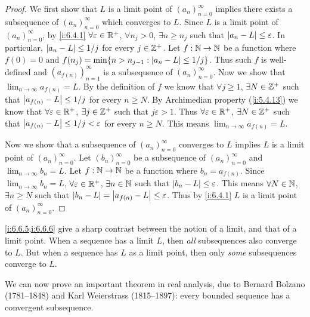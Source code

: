 \begin{proof}
  We first show that \(L\) is a limit point of \((a_n)_{n = 0}^\infty\) implies there exists a subsequence of \((a_n)_{n = 0}^\infty\) which converges to \(L\).
  Since \(L\) is a limit point of \((a_n)_{n = 0}^\infty\), by \cref{i:6.4.1} \(\forall \varepsilon \in \mathbb{R}^+\), \(\forall n_j > 0\), \(\exists n \geq n_j\) such that \(\left\lvert a_n - L\right\rvert \leq \varepsilon\).
  In particular, \(\left\lvert a_n - L\right\rvert \leq 1 / j\) for every \(j \in \mathbb{Z}^+\).
  Let \(f : \mathbb{N} \to \mathbb{N}\) be a function where \(f(0) = 0\) and \(f(n_j) = \min\set{n > n_{j - 1} : \abs{a_n - L} \leq 1 / j}\).
  Thus such \(f\) is well-defined and \((a_{f(n)})_{n = 1}^\infty\) is a subsequence of \((a_n)_{n = 0}^\infty\).
  Now we show that \(\lim_{n \to \infty} a_{f(n)} = L\).
  By the definition of \(f\) we know that \(\forall j \geq 1\), \(\exists N \in \mathbb{Z}^+\) such that \(\left\lvert a_{f(n)} - L\right\rvert \leq 1 / j\) for every \(n \geq N\).
  By Archimedian property (\cref{i:5.4.13}) we know that \(\forall \varepsilon \in \mathbb{R}^+\), \(\exists j \in \mathbb{Z}^+\) such that \(j \varepsilon > 1\).
  Thus \(\forall \varepsilon \in \mathbb{R}^+\), \(\exists N \in \mathbb{Z}^+\) such that \(\left\lvert a_{f(n)} - L\right\rvert \leq 1 / j < \varepsilon\) for every \(n \geq N\).
  This means \(\lim_{n \to \infty} a_{f(n)} = L\).

  Now we show that a subsequence of \((a_n)_{n = 0}^\infty\) converges to \(L\) implies \(L\) is a limit point of \((a_n)_{n = 0}^\infty\).
  Let \((b_n)_{n = 0}^\infty\) be a subsequence of \((a_n)_{n = 0}^\infty\) and \(\lim_{n \to \infty} b_n = L\).
  Let \(f : \mathbb{N} \to \mathbb{N}\) be a function where \(b_n = a_{f(n)}\).
  Since \(\lim_{n \to \infty} b_n = L\), \(\forall \varepsilon \in \mathbb{R}^+\), \(\exists n \in \mathbb{N}\) such that \(\left\lvert b_n - L\right\rvert \leq \varepsilon\).
  This means \(\forall N \in \mathbb{N}\), \(\exists n \geq N\) such that \(\left\lvert b_n - L\right\rvert = \left\lvert a_{f(n)} - L\right\rvert \leq \varepsilon\).
  Thus by \cref{i:6.4.1} \(L\) is a limit point of \((a_n)_{n = 0}^\infty\).
\end{proof}

\begin{rmk}\label{i:6.6.7}
  \cref{i:6.6.5,i:6.6.6} give a sharp contrast between the notion of a limit, and that of a limit point.
  When a sequence has a limit \(L\), then \emph{all} subsequences also converge to \(L\).
  But when a sequence has \(L\) as a limit point, then only \emph{some} subsequences converge to \(L\).
\end{rmk}

\begin{note}
  We can now prove an important theorem in real analysis, due to Bernard Bolzano (1781--1848) and Karl Weierstrass (1815--1897):
  every bounded sequence has a convergent subsequence.
\end{note}

